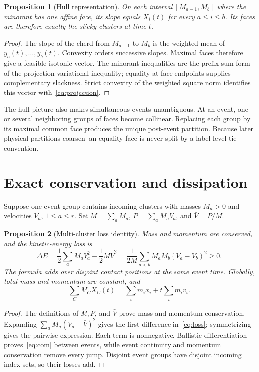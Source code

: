 \documentclass[10pt]{article}
\newtheorem{proposition}{Proposition}
\begin{document}
\begin{proposition}[Hull representation]\label{prop:hull}
On each interval $[M_{a-1},M_b]$ where the minorant has one affine face, its
slope equals $X_i(t)$ for every $a\leq i\leq b$.  Its faces are therefore
exactly the sticky clusters at time $t$.
\end{proposition}
\begin{proof}
The slope of the chord from $M_{a-1}$ to $M_b$ is the weighted mean of
$y_a(t),\ldots,y_b(t)$.  Convexity orders successive slopes.  Maximal faces
therefore give a feasible isotonic vector.  The minorant inequalities are
the prefix-sum form of the projection variational inequality; equality at
face endpoints supplies complementary slackness.  Strict convexity of the
weighted square norm identifies this vector with~\eqref{eq:projection}.
\end{proof}

The hull picture also makes simultaneous events unambiguous.  At an event,
one or several neighboring groups of faces become collinear.  Replacing each
group by its maximal common face produces the unique post-event partition.
Because later physical partitions coarsen, an equality face is never split
by a label-level tie convention.

\section{Exact conservation and dissipation}
Suppose one event group contains incoming clusters with masses $M_a>0$ and
velocities $V_a$, $1\leq a\leq r$.  Set
$M=\sum_aM_a$, $P=\sum_aM_aV_a$, and $\bar V=P/M$.

\begin{proposition}[Multi-cluster loss identity]\label{prop:loss}
Mass and momentum are conserved, and the kinetic-energy loss is
\begin{equation}\label{eq:loss}
 \Delta E
 =\frac12\sum_aM_aV_a^2-\frac12M\bar V^2
 =\frac1{2M}\sum_{a<b}M_aM_b(V_a-V_b)^2\geq0.
\end{equation}
The formula adds over disjoint contact positions at the same event time.
Globally, total mass and momentum are constant, and
\begin{equation}\label{eq:com}
 \sum_C M_CX_C(t)=\sum_i m_ix_i+t\sum_i m_iv_i.
\end{equation}
\end{proposition}
\begin{proof}
The definitions of $M,P$, and $\bar V$ prove mass and momentum conservation.
Expanding
$\sum_aM_a(V_a-\bar V)^2$ gives the first difference
in~\eqref{eq:loss}; symmetrizing gives the pairwise expression.  Each term is
nonnegative.  Ballistic differentiation proves~\eqref{eq:com} between
events, while event continuity and momentum conservation remove every jump.
Disjoint event groups have disjoint incoming index sets, so their losses add.
\end{proof}
\end{document}
